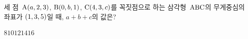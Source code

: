 세 점~$\mathrm{A}(a{,}\mkern3mu\mathopen{}2{,}\mkern3mu\mathopen{}3)$, $\mathrm{B}(0{,}\mkern3mu\mathopen{}b{,}\mkern3mu\mathopen{}1)$, $\mathrm{C}(4{,}\mkern3mu\mathopen{}3{,}\mkern3mu\mathopen{}c)$를 꼭짓점으로 하는 삼각형~$\mathrm{ABC}$의 무게중심의 좌표가 $(1{,}\mkern3mu\mathopen{}3{,}\mkern3mu\mathopen{}5)$일 때, $a+b+c$의 값은?
\begin{choices32}{$8$}{$10$}{$12$}{$14$}{$16$}\end{choices32}
